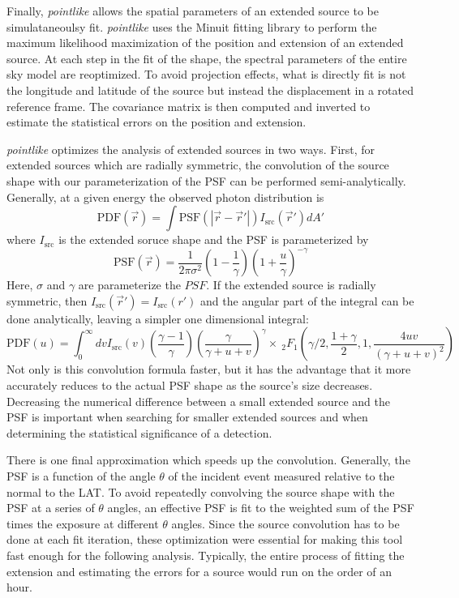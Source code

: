 \documentclass[preprint]{aastex}
\newcommand{\pointlike}{{\em pointlike}\xspace}
\begin{document}
Finally, \pointlike allows the spatial parameters of an extended
source to be simulataneoulsy fit. \pointlike uses the Minuit fitting
library to perform the maximum likelihood maximization of the position
and extension of an extended source\cite{Minuit reference}.  At each
step in the fit of the shape, the spectral parameters of the entire sky
model are reoptimized. To avoid projection effects, what is directly
fit is not the longitude and latitude of the source but instead
the displacement in a rotated reference frame. The covariance matrix is
then computed and inverted to estimate the statistical errors on the
position and extension.

\pointlike optimizes the analysis of extended sources in two ways.
First, for extended sources which are radially symmetric, the convolution
of the source shape with our parameterization of the PSF can be performed
semi-analytically. Generally, at a given energy the observed 
photon distribution is
\begin{equation}
  \text{PDF}(\vec r) = \int  \text{PSF}(|\vec r - \vec r'|)I_\text{src}(\vec r') d A' 
\end{equation}
where $I_\text{src}$ is the extended soruce shape and the PSF is parameterized by
\begin{equation}
  \text{PSF}(\vec r) = 
  \frac{1}{2\pi\sigma^2}
  \left(1-\frac{1}{\gamma}\right)
  \left(1+\frac{u}{\gamma}\right)^{-\gamma}
\end{equation}
Here, $\sigma$ and $\gamma$ are parameterize the $PSF$.
If the extended source is radially symmetric, then
$I_\text{src} (\vec r') = I_\text{src} (r')$ and the angular part of the
integral can be done analytically, leaving a simpler one dimensional
integral:
\begin{equation}
  \text{PDF}(u)= \int_0^\infty dv
  I_\text{src}(v) 
  \left(\frac{\gamma-1}{\gamma}\right)
  \left( \frac{\gamma}{\gamma + u + v}\right)^\gamma 
  \times ~_2F_1 \left(\gamma/2,\frac{1+\gamma}{2},1,\frac{4uv}{(\gamma+u+v)^2}\right)
\end{equation}
Not only is this convolution formula faster, but it has the advantage
that it more accurately reduces to the actual PSF shape as the source's
size decreases.  Decreasing the numerical difference between a small extended
source and the PSF is important when searching for smaller extended sources
and when determining the statistical significance of a detection.

There is one final approximation which speeds up the convolution.
Generally, the PSF is a function of the angle $\theta$ of the incident
event measured relative to the normal to the LAT. To avoid repeatedly
convolving the source shape with the PSF at a series of $\theta$ angles,
an effective PSF is fit to the weighted sum of the PSF times the exposure
at different $\theta$ angles.  Since the source convolution has to be
done at each fit iteration, these optimization were essential for making
this tool fast enough for the following analysis. Typically, the entire
process of fitting the extension and estimating the errors for a source
would run on the order of an hour.
\end{document}
